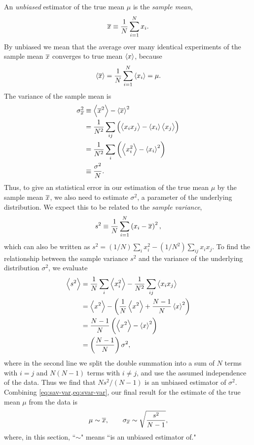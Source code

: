 An \emph{unbiased} estimator of the true mean $\mu$ is the \emph{sample mean},
\begin{equation}
  \overline{x} \equiv \frac{1}{N} \sum_{i=1}^N x_i.
\end{equation}
By unbiased we mean that the average over many identical experiments of the
sample mean $\overline{x}$ converges to true mean $\left< x \right>$, because
\begin{equation}
  \left< \overline{x} \right> = \frac{1}{N} \sum_{i=1}^N \left< x_i \right> = \mu.
\end{equation}
The variance of the sample mean is
\begin{align}
  \sigma_{\overline{x}}^2
  &\equiv \left< \overline{x}^2 \right> - \left< \overline{x} \right>^2\nonumber\\
  &=\frac{1}{N^2} \sum_{ij} \left(\left< x_i x_j \right> - \left< x_i \right>\left< x_j \right>\right)\nonumber\\
  &=\frac{1}{N^2} \sum_i \left(\left< x_i^2 \right>-\left< x_i \right>^2\right)\nonumber\\
  &\equiv\frac{\sigma^2}{N}.
  \label{eq:sav-var}
\end{align}
Thus, to give an statistical error in our estimation of the true mean $\mu$ by
the sample mean $\overline{x}$, we also need to estimate $\sigma^2$, a parameter of
the underlying distribution. We expect this to be related to the \emph{sample
  variance},
\begin{equation}
  s^2 \equiv \frac{1}{N} \sum_{i=1}^N \left(x_i - \overline{x}\right)^2,
\end{equation}
which can also be written as $s^2 = (1/N) \sum_i x_i^2 - (1/N^2) \sum_{ij} x_i
x_j$. To find the relationship between the sample variance $s^2$ and the
variance of the underlying distribution $\sigma^2$, we evaluate
\begin{align}
  \left< s^2 \right>
  &= \frac{1}{N} \sum_i \left< x_i^2 \right> -
     \frac{1}{N^2} \sum_{ij} \left< x_i x_j \right>\nonumber\\
  &= \left< x^2 \right> - \left(\frac{1}{N} \left< x^2 \right> + \frac{N-1}{N} \left< x \right>^2\right)\nonumber\\
  &= \frac{N-1}{N} \left(\left< x^2 \right> - \left< x \right>^2\right)\nonumber\\
  &= \left(\frac{N-1}{N}\right) \sigma^2,
  \label{eq:svar-var}
\end{align}
where in the second line we split the double summation into a sum of $N$ terms
with $i=j$ and $N(N-1)$ terms with $i \neq j$, and use the assumed independence
of the data. Thus we find that $N s^2/(N-1)$ is an unbiased estimator of
$\sigma^2$. Combining \cref{eq:sav-var,eq:svar-var}, our final result for the
estimate of the true mean $\mu$ from the data is
\begin{equation}
  \mu \sim \overline{x}, \qquad
  \sigma_{\overline{x}} \sim \sqrt{\frac{s^2}{N-1}},
  \label{eq:mean-est}
\end{equation}
where, in this section, ``$\sim$" means ``is an unbiased estimator of."


